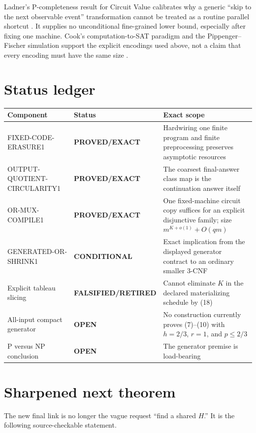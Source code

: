 \documentclass[11pt]{article}
\newcommand{\PROVED}{\textcolor{proved}{\textbf{PROVED/EXACT}}}
\newcommand{\COND}{\textcolor{conditional}{\textbf{CONDITIONAL}}}
\newcommand{\OPEN}{\textcolor{openstatus}{\textbf{OPEN}}}
\newcommand{\RETIRED}{\textcolor{retired}{\textbf{FALSIFIED/RETIRED}}}
\begin{document}
Ladner's P-completeness result for Circuit Value calibrates why a generic
``skip to the next observable event'' transformation cannot be treated as a
routine parallel shortcut \cite{ladner1975}.  It supplies no unconditional
fine-grained lower bound, especially after fixing one machine.  Cook's
computation-to-SAT paradigm and the Pippenger--Fischer simulation support the
explicit encodings used above, not a claim that every encoding must have the
same size \cite{cook1971,pippengerfischer1979}.

\section{Status ledger}

\begin{center}
\begin{tabularx}{\textwidth}{@{}>{\raggedright\arraybackslash}p{}
                                >{\raggedright\arraybackslash}p{}X@{}}
\toprule
Component & Status & Exact scope \\
\midrule
FIXED-CODE-ERASURE1 & \PROVED & Hardwiring one finite program and finite
preprocessing preserves asymptotic resources \\
OUTPUT-QUOTIENT-CIRCULARITY1 & \PROVED & The coarsest final-answer class map
is the continuation answer itself \\
OR-MUX-COMPILE1 & \PROVED & One fixed-machine circuit copy suffices for an
explicit disjunctive family; size $m^{K+o(1)}+O(qm)$ \\
GENERATED-OR-SHRINK1 & \COND & Exact implication from the displayed generator
contract to an ordinary smaller 3-CNF \\
Explicit tableau slicing & \RETIRED & Cannot eliminate $K$ in the declared
materializing schedule by (18) \\
All-input compact generator & \OPEN & No construction currently proves
(7)--(10) with $h=2/3$, $r=1$, and $p\le2/3$ \\
P versus NP conclusion & \OPEN & The generator premise is load-bearing \\
\bottomrule
\end{tabularx}
\end{center}

\section{Sharpened next theorem}

The new final link is no longer the vague request ``find a shared $H$.''  It
is the following source-checkable statement.
\end{document}
